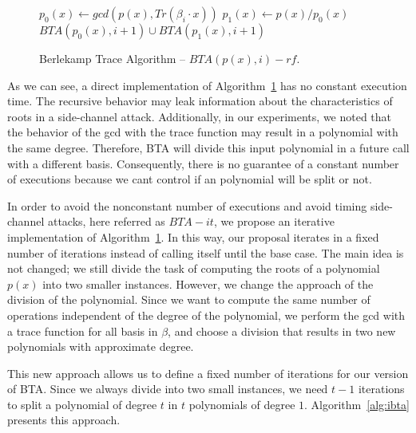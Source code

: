 \begin{figure}[ht]
\begin{algorithm}[H]
    $p_{0}(x) \gets gcd(p(x), Tr(\beta_{i}\cdot x))$\;
    $p_{1}(x) \gets p(x) / p_{0}(x)$ \;
\Return $BTA(p_{0}(x), i + 1) \cup BTA(p_{1}(x), i + 1)$\;
 \caption{Berlekamp Trace Algorithm -- $BTA(p(x), i)-rf$.}
  \label{alg:bta}
\end{algorithm}
\end{figure}

As we can see, a direct implementation of Algorithm~\ref{alg:bta} has no constant execution time. The recursive behavior may leak information about the characteristics of roots in a side-channel attack. Additionally, in our experiments, we noted that the behavior of the gcd with the trace function may result in a polynomial with the same degree. Therefore, BTA will divide this input polynomial in a future call with a different basis. Consequently, there is no guarantee of a constant number of executions because we cant control if an polynomial will be split or not. 

In order to avoid the nonconstant number of executions and avoid timing side-channel attacks, here referred as $BTA-it$, we propose an iterative implementation of Algorithm~\ref{alg:bta}. In this way, our proposal iterates in a fixed number of iterations instead of calling itself until the base case. The main idea is not changed; we still divide the task of computing the roots of a polynomial $p(x)$ into two smaller instances. However, we change the approach of the division of the polynomial. Since we want to compute the same number of operations independent of the degree of the polynomial, we perform the gcd with a trace function for all basis in $\beta$, and choose a division that results in two new polynomials with approximate degree.

This new approach allows us to define a fixed number of iterations for our version of BTA. Since we always divide into two small instances, we need $t-1$ iterations to split a polynomial of degree $t$ in $t$ polynomials of degree $1$. Algorithm~\ref{alg:ibta} presents this approach.


